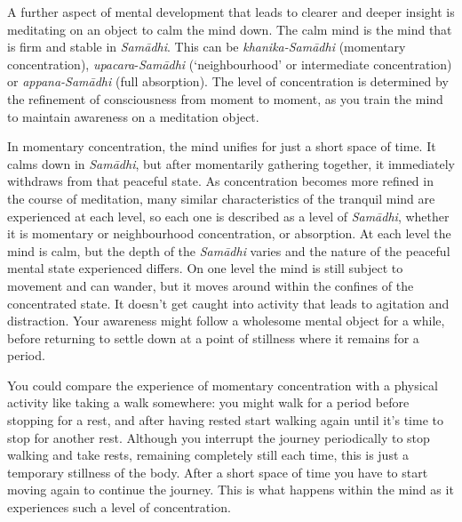 A further aspect of mental development that leads to clearer and deeper insight is meditating on an object to calm the mind down. The calm mind is the mind that is firm and stable in \textit{Sam\=adhi}. This can be \textit{khanika-Sam\=adhi} (momentary concentration), \textit{upacara}-\textit{Sam\=adhi} (`neighbourhood' or intermediate concentration) or \textit{appana-Sam\=adhi} (full absorption). The level of concentration is determined by the refinement of consciousness from moment to moment, as you train the mind to maintain awareness on a meditation object.

In momentary concentration, the mind unifies for just a short space of time. It calms down in \textit{Sam\=adhi}, but after momentarily gathering together, it immediately withdraws from that peaceful state. As concentration becomes more refined in the course of meditation, many similar characteristics of the tranquil mind are experienced at each level, so each one is described as a level of \textit{Sam\=adhi}, whether it is momentary or neighbourhood concentration, or absorption. At each level the mind is calm, but the depth of the \textit{Sam\=adhi} varies and the nature of the peaceful mental state experienced differs. On one level the mind is still subject to movement and can wander, but it moves around within the confines of the concentrated state. It doesn't get caught into activity that leads to agitation and distraction. Your awareness might follow a wholesome mental object for a while, before returning to settle down at a point of stillness where it remains for a period.

You could compare the experience of momentary concentration with a physical activity like taking a walk somewhere: you might walk for a period before stopping for a rest, and after having rested start walking again until it's time to stop for another rest. Although you interrupt the journey periodically to stop walking and take rests, remaining completely still each time, this is just a temporary stillness of the body. After a short space of time you have to start moving again to continue the journey. This is what happens within the mind as it experiences such a level of concentration.

